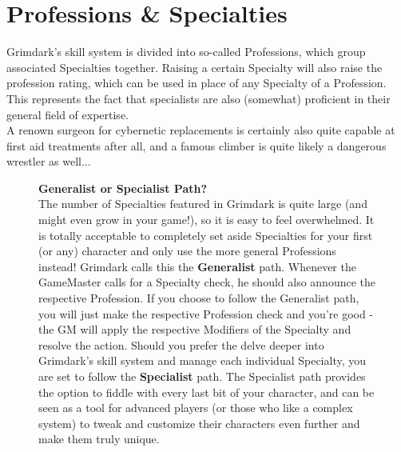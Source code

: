 \chapter{Professions \& Specialties}
	Grimdark's skill system is divided into so-called Professions, which group associated Specialties together. Raising a certain Specialty will also raise the profession rating, which can be used in place of any Specialty of a Profession. 
	This represents the fact that specialists are also (somewhat) proficient in their general field of expertise.\\
	A renown surgeon for cybernetic replacements is certainly also quite capable at first aid treatments after all, and a famous climber is quite likely a dangerous wrestler as well...
	\begin{figure}[ht]
		\begin{DndReadAloud}
		{\large\textbf{Generalist or Specialist Path?}}\\\noindent
		The number of Specialties featured in Grimdark is quite large (and might even grow in your game!), so it is easy to feel overwhelmed.
		It is totally acceptable to completely set aside Specialties for your first (or any) character and only use the more general Professions instead! Grimdark calls this the \textbf{Generalist} path.
		Whenever the GameMaster calls for a Specialty check, he should also announce the respective Profession.
		If you choose to follow the Generalist path, you will just make the respective Profession check and you're good - the GM will apply the respective Modifiers of the Specialty and resolve the action.
	\noindent
		Should you prefer the delve deeper into Grimdark's skill system and manage each individual Specialty, you are set to follow the \textbf{Specialist} path.
		The Specialist path provides the option to fiddle with every last bit of your character, and can be seen as a tool for advanced players (or those who like a complex system) to tweak and customize their characters even further and make them truly unique.
		\end{DndReadAloud}
	\end{figure}

